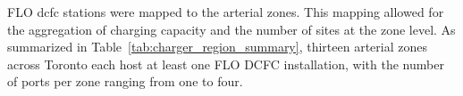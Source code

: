 FLO \gls{dcfc} stations were mapped to the arterial zones. This mapping allowed for the aggregation of charging capacity and the number of sites at the zone level. As summarized in Table~\ref{tab:charger_region_summary}, thirteen arterial zones across Toronto each host at least one FLO DCFC installation, with the number of ports per zone ranging from one to four.

